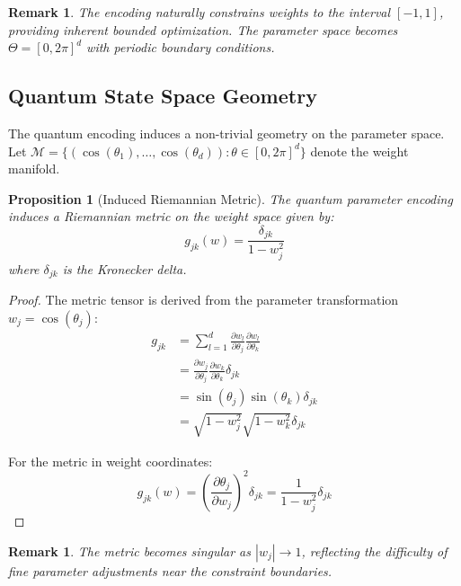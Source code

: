 \documentclass[11pt]{article}
\newtheorem{proposition}[theorem]{Proposition}
\newtheorem{remark}[theorem]{Remark}
\begin{document}
\begin{remark}
The encoding naturally constrains weights to the interval $[-1, 1]$, providing inherent bounded optimization. The parameter space becomes $\Theta = [0, 2\pi]^d$ with periodic boundary conditions.
\end{remark}

\subsection{Quantum State Space Geometry}

The quantum encoding induces a non-trivial geometry on the parameter space. Let $\mathcal{M} = \{(\cos(\theta_1), \ldots, \cos(\theta_d)) : \theta \in [0, 2\pi]^d\}$ denote the weight manifold.

\begin{proposition}[Induced Riemannian Metric]
The quantum parameter encoding induces a Riemannian metric on the weight space given by:
\begin{equation}
g_{jk}(w) = \frac{\delta_{jk}}{1 - w_j^2}
\label{eq:riemannian_metric}
\end{equation}
where $\delta_{jk}$ is the Kronecker delta.
\end{proposition}

\begin{proof}
The metric tensor is derived from the parameter transformation $w_j = \cos(\theta_j)$:
\begin{align}
g_{jk} &= \sum_{l=1}^d \frac{\partial w_l}{\partial \theta_j} \frac{\partial w_l}{\partial \theta_k} \\
&= \frac{\partial w_j}{\partial \theta_j} \frac{\partial w_k}{\partial \theta_k} \delta_{jk} \\
&= \sin(\theta_j) \sin(\theta_k) \delta_{jk} \\
&= \sqrt{1 - w_j^2} \sqrt{1 - w_k^2} \delta_{jk}
\end{align}

For the metric in weight coordinates:
\begin{equation}
g_{jk}(w) = \left(\frac{\partial \theta_j}{\partial w_j}\right)^2 \delta_{jk} = \frac{1}{1 - w_j^2} \delta_{jk}
\end{equation}
\end{proof}

\begin{remark}
The metric becomes singular as $|w_j| \to 1$, reflecting the difficulty of fine parameter adjustments near the constraint boundaries.
\end{remark}
\end{document}
